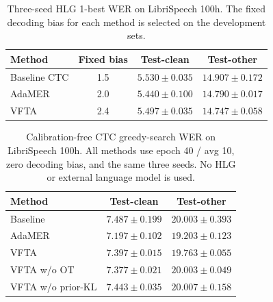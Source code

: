 
\begin{table}[t]
  \centering
  \small
  \caption{Three-seed HLG 1-best WER on LibriSpeech 100h. The fixed
  decoding bias for each method is selected on the development sets.}
  \label{tab:libri100_hlg_main}
  \begin{tabular}{lccc}
    \toprule
    Method & Fixed bias & Test-clean & Test-other \\
    \midrule
    Baseline CTC
      & 1.5
      & $5.530 \pm 0.035$
      & $14.907 \pm 0.172$ \\
    AdaMER
      & 2.0
      & $\mathbf{5.440 \pm 0.100}$
      & $14.790 \pm 0.017$ \\
    VFTA
      & 2.4
      & $5.497 \pm 0.035$
      & $\mathbf{14.747 \pm 0.058}$ \\
    \bottomrule
  \end{tabular}
\end{table}

\begin{table}[t]
  \centering
  \small
  \caption{Calibration-free CTC greedy-search WER on LibriSpeech 100h.
  All methods use epoch 40 / avg 10, zero decoding bias, and the same
  three seeds. No HLG or external language model is used.}
  \label{tab:libri100_greedy_ablation}
  \begin{tabular}{lcc}
    \toprule
    Method & Test-clean & Test-other \\
    \midrule
    Baseline
      & $7.487 \pm 0.199$
      & $20.003 \pm 0.393$ \\
    AdaMER
      & $\mathbf{7.197 \pm 0.102}$
      & $\mathbf{19.203 \pm 0.123}$ \\
    VFTA
      & $7.397 \pm 0.015$
      & $19.763 \pm 0.055$ \\
    VFTA w/o OT
      & $7.377 \pm 0.021$
      & $20.003 \pm 0.049$ \\
    VFTA w/o prior-KL
      & $7.443 \pm 0.035$
      & $20.007 \pm 0.158$ \\
    \bottomrule
  \end{tabular}
\end{table}

